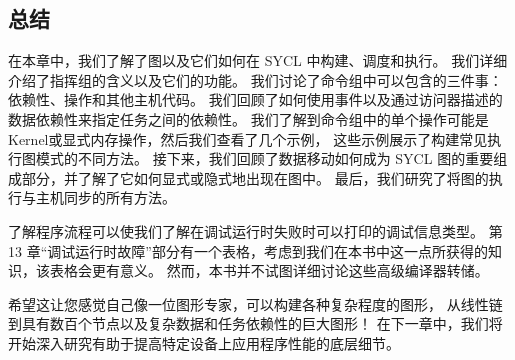 \subsection{总结}
在本章中，我们了解了图以及它们如何在 SYCL 中构建、调度和执行。 
我们详细介绍了指挥组的含义以及它们的功能。 
我们讨论了命令组中可以包含的三件事：依赖性、操作和其他主机代码。 
我们回顾了如何使用事件以及通过访问器描述的数据依赖性来指定任务之间的依赖性。 
我们了解到命令组中的单个操作可能是Kernel或显式内存操作，然后我们查看了几个示例，
这些示例展示了构建常见执行图模式的不同方法。 
接下来，我们回顾了数据移动如何成为 SYCL 图的重要组成部分，并了解了它如何显式或隐式地出现在图中。 
最后，我们研究了将图的执行与主机同步的所有方法。

了解程序流程可以使我们了解在调试运行时失败时可以打印的调试信息类型。 
第 13 章“调试运行时故障”部分有一个表格，考虑到我们在本书中这一点所获得的知识，该表格会更有意义。 
然而，本书并不试图详细讨论这些高级编译器转储。

希望这让您感觉自己像一位图形专家，可以构建各种复杂程度的图形，
从线性链到具有数百个节点以及复杂数据和任务依赖性的巨大图形！ 
在下一章中，我们将开始深入研究有助于提高特定设备上应用程序性能的底层细节。